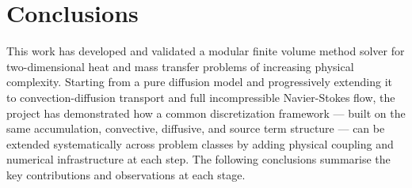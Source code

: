 \section*{Conclusions}

This work has developed and validated a modular finite volume method solver for two-dimensional heat and mass transfer problems of increasing physical complexity. Starting from a pure diffusion model and progressively extending it to convection-diffusion transport and full incompressible Navier-Stokes flow, the project has demonstrated how a common discretization framework — built on the same accumulation, convective, diffusive, and source term structure — can be extended systematically across problem classes by adding physical coupling and numerical infrastructure at each step. The following conclusions summarise the key contributions and observations at each stage.

